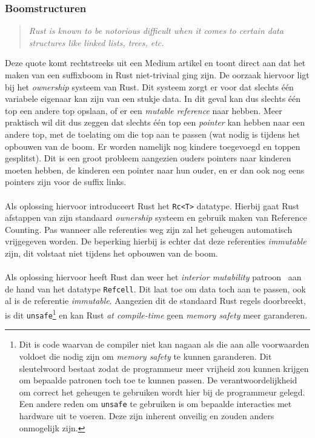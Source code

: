 \subsubsection{Boomstructuren}
\begin{quote}
    \textit{Rust is known to be notorious difficult when it comes to certain data structures like linked lists, trees, etc. \cite{rust_difficulty_quote}}
\end{quote}
Deze quote komt rechtstreeks uit een Medium artikel en toont direct aan dat het maken van een suffixboom in Rust niet-triviaal ging zijn.
De oorzaak hiervoor ligt bij het \textit{ownership} systeem van Rust.
Dit systeem zorgt er voor dat slechts één variabele eigenaar kan zijn van een stukje data.
In dit geval kan dus slechts één top een andere top opslaan, of er een \textit{mutable reference} naar hebben.
Meer praktisch wil dit dus zeggen dat slechts één top een \textit{pointer} kan hebben naar een andere top, met de toelating om die top aan te passen (wat nodig is tijdens het opbouwen van de boom. Er worden namelijk nog kindere toegevoegd en toppen gesplitst).
Dit is een groot probleem aangezien ouders pointers naar kinderen moeten hebben, de kinderen een pointer naar hun ouder, en er dan ook nog eens pointers zijn voor de suffix links.
\\ \\
Als oplossing hiervoor introduceert Rust het \texttt{Rc<T>} datatype.
Hierbij gaat Rust afstappen van zijn standaard \textit{ownership} systeem en gebruik maken van Reference Counting.
Pas wanneer alle referenties weg zijn zal het geheugen automatisch vrijgegeven worden.
De beperking hierbij is echter dat deze referenties \textit{immutable} zijn, dit volstaat niet tijdens het opbouwen van de boom.
\\ \\
Als oplossing hiervoor heeft Rust dan weer het \textit{interior mutability} patroon~\cite{interior_mutability} aan de hand van het datatype \texttt{Refcell}.
Dit laat toe om data toch aan te passen, ook al is de referentie \textit{immutable}.
Aangezien dit de standaard Rust regels doorbreekt, is dit \texttt{unsafe}\footnote{Dit is code waarvan de compiler niet kan nagaan als die aan alle voorwaarden voldoet die nodig zijn om \textit{memory safety} te kunnen garanderen. Dit sleutelwoord bestaat zodat de programmeur meer vrijheid zou kunnen krijgen om bepaalde patronen toch toe te kunnen passen. De verantwoordelijkheid om correct het geheugen te gebruiken wordt hier bij de programmeur gelegd. Een andere reden om \texttt{unsafe} te gebruiken is om bepaalde interacties met hardware uit te voeren. Deze zijn inherent onveilig en zouden anders onmogelijk zijn.} en kan Rust \textit{at compile-time} geen \textit{memory safety} meer garanderen.

